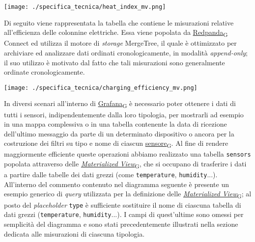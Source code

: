 \begin{center}
	\texttt{[image: ./specifica\_tecnica/heat\_index\_mv.png]}
\end{center}

Di seguito viene rappresentata la tabella che contiene le misurazioni relative all'efficienza delle colonnine elettriche. Essa viene popolata da \href{https://7last.github.io/docs/pb/documentazione-interna/glossario\#redpanda}{Redpanda\textsubscript{G}} Connect ed utilizza il motore di \textit{storage}
MergeTree, il quale è ottimizzato per archiviare ed analizzare dati ordinati cronologicamente, in modalità \textit{append-only}; il suo
utilizzo è motivato dal fatto che tali misurazioni sono generalmente ordinate cronologicamente.

\begin{center}
	\texttt{[image: ./specifica\_tecnica/charging\_efficiency\_mv.png]}
\end{center}
In diversi scenari all'interno di \href{https://7last.github.io/docs/pb/documentazione-interna/glossario\#grafana}{Grafana\textsubscript{G}} è necessario poter ottenere i dati di tutti i sensori, indipendentemente dalla loro tipologia, per mostrarli ad esempio in una mappa
complessiva o in una tabella contenente la data di ricezione dell'ultimo messaggio da parte di un determinato dispositivo o ancora per la costruzione dei filtri su tipo e nome di ciascun \href{https://7last.github.io/docs/pb/documentazione-interna/glossario\#sensore}{sensore\textsubscript{G}}.
Al fine di rendere maggiormente efficiente queste operazioni abbiamo realizzato una tabella \texttt{sensors} popolata attraverso delle \href{https://7last.github.io/docs/pb/documentazione-interna/glossario\#materialized-view}{\textit{Materialized View}\textsubscript{G}},
che si occupano di trasferire i dati a partire dalle tabelle dei dati grezzi (come \texttt{temperature}, \texttt{humidity}...).
All'interno del commento contenuto nel diagramma seguente è presente un esempio generico di \textit{query} utilizzata per la definizione delle \href{https://7last.github.io/docs/pb/documentazione-interna/glossario\#materialized-view}{\textit{Materialized View}\textsubscript{G}}; al posto del \textit{placeholder}
\texttt{{type}} è sufficiente sostituire il nome di ciascuna tabella di dati grezzi (\texttt{temperature}, \texttt{humidity}...).
I campi di quest'ultime sono omessi per semplicità del diagramma e sono stati precedentemente illustrati nella sezione dedicata alle misurazioni di ciascuna tipologia.

